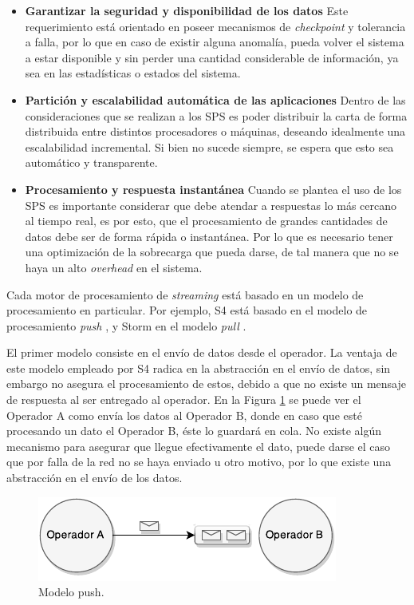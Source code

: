 \begin{itemize}
	\item \textbf{Garantizar la seguridad y disponibilidad de los datos} Este requerimiento está orientado en poseer mecanismos de \textit{checkpoint} y tolerancia a falla, por lo que en caso de existir alguna anomalía, pueda volver el sistema a estar disponible y sin perder una cantidad considerable de información, ya sea en las estadísticas o estados del sistema.
	\item \textbf{Partición y escalabilidad automática de las aplicaciones} Dentro de las consideraciones que se realizan a los SPS es poder distribuir la carta de forma distribuida entre distintos procesadores o máquinas, deseando idealmente una escalabilidad incremental. Si bien no sucede siempre, se espera que esto sea automático y transparente.
	\item \textbf{Procesamiento y respuesta instantánea} Cuando se plantea el uso de los SPS es importante considerar que debe atendar a respuestas lo más cercano al tiempo real, es por esto, que el procesamiento de grandes cantidades de datos debe ser de forma rápida o instantánea. Por lo que es necesario tener una optimización de la sobrecarga que pueda darse, de tal manera que no se haya un alto \textit{overhead} en el sistema.	
\end{itemize}

Cada motor de procesamiento de \textsl{streaming} está basado en un modelo de procesamiento en particular. Por ejemplo, S4 está basado en el modelo de procesamiento \textsl{push} \citep{s4yahoo}, y Storm en el modelo \textsl{pull} \citep{stormtwitter}.

El primer modelo consiste en el envío de datos desde el operador. La ventaja de este modelo empleado por S4 radica en la abstracción en el envío de datos, sin embargo no asegura el procesamiento de estos, debido a que no existe un mensaje de respuesta al ser entregado al operador. En la Figura \ref{fig:sps-push} se puede ver el Operador A como envía los datos al Operador B, donde en caso que esté procesando un dato el Operador B, éste lo guardará en cola. No existe algún mecanismo para asegurar que llegue efectivamente el dato, puede darse el caso que por falla de la red no se haya enviado u otro motivo, por lo que existe una abstracción en el envío de los datos.

\begin{figure}[ht!]
  \centering
    \includegraphics[scale=1]{images/SPS-Push.pdf}
  \caption{Modelo push.}
  \label{fig:sps-push}
\end{figure}

